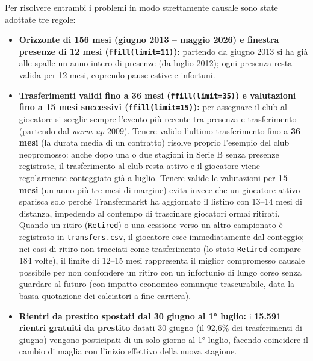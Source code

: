 Per risolvere entrambi i problemi in modo strettamente causale sono state adottate tre regole:
\begin{itemize}
    \item \textbf{Orizzonte di 156 mesi (giugno 2013 -- maggio 2026) e finestra presenze di 12 mesi (\texttt{ffill(limit=11)}):} partendo da giugno 2013 si ha già alle spalle un anno intero di presenze (da luglio 2012); ogni presenza resta valida per 12 mesi, coprendo pause estive e infortuni.
    \item \textbf{Trasferimenti validi fino a 36 mesi (\texttt{ffill(\allowbreak limit=35)}) e valutazioni fino a 15 mesi successivi (\texttt{ffill(limit=15)}):} per assegnare il club al giocatore si sceglie sempre l'evento più recente tra presenza e trasferimento (partendo dal \textit{warm-up} 2009). Tenere valido l'ultimo trasferimento fino a \textbf{36 mesi} (la durata media di un contratto) risolve proprio l'esempio del club neopromosso: anche dopo una o due stagioni in Serie B senza presenze registrate, il trasferimento al club resta attivo e il giocatore viene regolarmente conteggiato già a luglio. Tenere valide le valutazioni per \textbf{15 mesi} (un anno più tre mesi di margine) evita invece che un giocatore attivo sparisca solo perché Transfermarkt ha aggiornato il listino con 13--14 mesi di distanza, impedendo al contempo di trascinare giocatori ormai ritirati. Quando un ritiro (\texttt{Retired}) o una cessione verso un altro campionato è registrato in \texttt{transfers.csv}, il giocatore esce immediatamente dal conteggio; nei casi di ritiro non tracciati come trasferimento (lo stato \texttt{Retired} compare 184 volte), il limite di 12--15 mesi rappresenta il miglior compromesso causale possibile per non confondere un ritiro con un infortunio di lungo corso senza guardare al futuro (con impatto economico comunque trascurabile, data la bassa quotazione dei calciatori a fine carriera).
    \item \textbf{Rientri da prestito spostati dal 30 giugno al 1° luglio:} i \textbf{15.591 rientri gratuiti da prestito} datati 30 giugno (il 92,6\% dei trasferimenti di giugno) vengono posticipati di un solo giorno al 1° luglio, facendo coincidere il cambio di maglia con l'inizio effettivo della nuova stagione.
\end{itemize}

